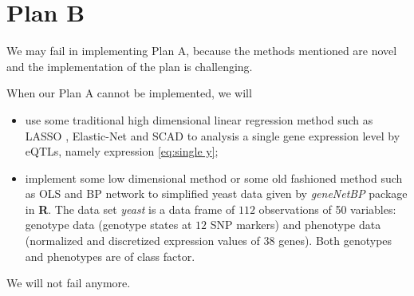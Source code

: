 \section{Plan B}

We may fail in implementing Plan A, because the methods mentioned are novel and the implementation of the plan is challenging. 

When our Plan A cannot be implemented, we will 
\begin{itemize}
    \item use some traditional high dimensional linear regression method such as LASSO \citep{tibshirani1996regression}, Elastic-Net \citep{zou2005regularization} and SCAD \citep{fan2001variable} to analysis a single gene expression level by eQTLs, namely expression \eqref{eq:single y};
    \item implement some low dimensional method or some old fashioned method such as OLS and BP network to simplified yeast data given by \emph{geneNetBP} package \cite{moharil2016package} in \textbf{R}. 
    The data set \emph{yeast} is a data frame of $112$ observations of 50 variables: genotype data (genotype states at $12$ SNP markers) and phenotype data (normalized and discretized expression values of $38$ genes). 
    Both genotypes and phenotypes are of class factor.
\end{itemize}

We will not fail anymore. 
